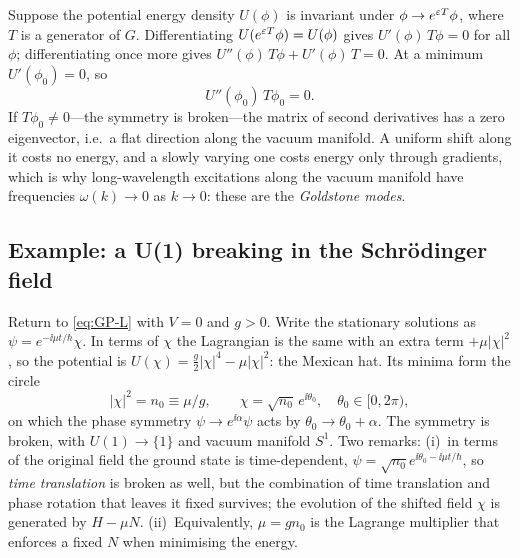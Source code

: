 Suppose the potential energy density $U(\phi)$ is invariant under
$\phi\to e^{\varepsilon T}\phi$, where $T$ is a generator of $G$. Differentiating
$U(e^{\varepsilon T}\phi)=U(\phi)$ gives $U'(\phi)\,T\phi=0$ for all $\phi$; differentiating
once more gives $U''(\phi)\,T\phi+U'(\phi)\,T=0$. At a minimum $U'(\phi_0)=0$, so
\begin{equation}
  U''(\phi_0)\,T\phi_0=0 .
\end{equation}
If $T\phi_0\neq0$---the symmetry is broken---the matrix of second derivatives
has a zero eigenvector, i.e.\ a flat direction along the vacuum manifold. A
uniform shift along it costs no energy, and a slowly varying one costs energy
only through gradients, which is why long-wavelength excitations along the
vacuum manifold have frequencies $\omega(k)\to0$ as $k\to0$: these are the
\emph{Goldstone modes}.

\subsection{Example: a U(1) breaking in the Schr\"odinger field}

Return to \eqref{eq:GP-L} with $V=0$ and $g>0$. Write the stationary solutions as
$\psi=e^{-\ii\mu t/\hbar}\chi$. In terms of $\chi$ the Lagrangian is the same
with an extra term $+\mu|\chi|^2$, so the potential is
$U(\chi)=\tfrac g2|\chi|^4-\mu|\chi|^2$: the Mexican hat. Its minima form the
circle
\begin{equation}
  |\chi|^2=n_0\equiv\mu/g,\qquad \chi=\sqrt{n_0}\,e^{\ii\theta_0},\quad\theta_0\in[0,2\pi),
\end{equation}
on which the phase symmetry $\psi\to e^{\ii\alpha}\psi$ acts by $\theta_0\to\theta_0+\alpha$. The
symmetry is broken, with $U(1)\to\{1\}$ and vacuum manifold $S^1$. Two remarks:
(i)~in terms of the original field the ground state is time-dependent, $\psi=\sqrt{n_0}e^{\ii\theta_0-\ii\mu t/\hbar}$,
so \emph{time translation} is broken as well, but the combination of time translation
and phase rotation that leaves it fixed survives; the evolution of the shifted field $\chi$ is generated
by $H-\mu N$. (ii)~Equivalently, $\mu=gn_0$ is the Lagrange multiplier that enforces
a fixed $N$ when minimising the energy.

